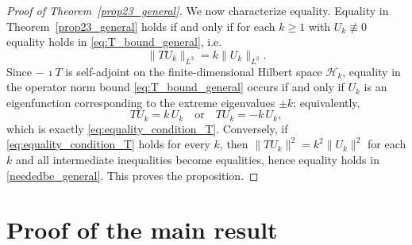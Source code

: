 \documentclass[11pt]{amsart}
\numberwithin{equation}{section}
\def\ge{\geqslant}
\begin{document}
\begin{proof}[Proof of Theorem~\ref{prop23_general}]
We now characterize equality. Equality in Theorem~\ref{prop23_general} holds if and only if
for each $k\ge 1$ with $U_k\not\equiv 0$ equality holds in \eqref{eq:T_bound_general}, i.e.
\[
\|TU_k\|_{L^2}=k\|U_k\|_{L^2}.
\]
Since $-\,\imath T$ is self-adjoint on the finite-dimensional Hilbert space $\mathcal H_k$,
equality in the operator norm bound \eqref{eq:T_bound_general} occurs if and only if $U_k$ is an
eigenfunction corresponding to the extreme eigenvalues $\pm k$; equivalently,
\[
TU_k=k\,U_k
\quad\text{or}\quad
TU_k=-k\,U_k,
\]
which is exactly \eqref{eq:equality_condition_T}. Conversely, if \eqref{eq:equality_condition_T}
holds for every $k$, then $\|TU_k\|^2=k^2\|U_k\|^2$ for each $k$ and all intermediate
inequalities become equalities, hence equality holds in \eqref{neededbe_general}.
This proves the proposition.
\end{proof}


\section{Proof of the main result}
\end{document}
